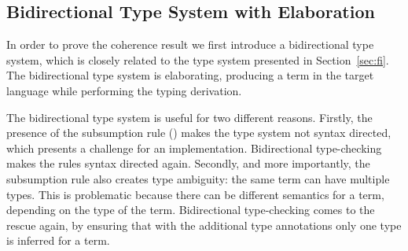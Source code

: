 %
%
%
%




\subsection{Bidirectional Type System with Elaboration}

In order to prove the coherence result we first introduce a bidirectional
type system, which is closely related to the type system presented in
Section~\ref{sec:fi}. The bidirectional type system is elaborating, producing a term 
in the target language while performing the typing derivation.

The bidirectional type system is useful for two different
reasons. Firstly, the presence of the subsumption rule
() makes the type system not syntax directed,
which presents a challenge for an implementation. Bidirectional
type-checking makes the rules syntax directed again.  Secondly, and
more importantly, the subsumption rule also creates type ambiguity:
the same term can have multiple types. This is problematic because
there can be different semantics for a term, depending on the type of
the term. Bidirectional type-checking comes to the rescue again, by
ensuring that with the additional type annotations only one type is
inferred for a term.

